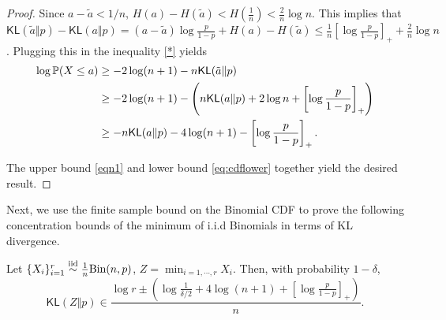 \documentclass[12pt]{article}
\newcommand{\KL}{\textsf{KL}}
\begin{document}
\begin{proof}
    

        Since $a - \tilde{a} < 1/n$, $H(a) - H(\tilde{a}) < H(\frac{1}{n}) < \frac{2}{n} \log n$. This implies that $\KL(\tilde a\Vert p) - \KL(a\Vert p)= (a-\tilde{a})\log \frac{p}{1-p} + H(a) - H(\tilde{a}) \leq \frac{1}{n} \left[ \log \frac{p}{1-p} \right]_+ + \frac{2}{n} \log n$. Plugging this in the inequality \eqref{*} yields
    \begin{align}
        \log \mathbb{P}(X \leq a) &\geq -2\log(n+1) - n\KL(\tilde{a}\Vert p)\notag\\
        &\geq -2\log(n+1) - \left(n\KL(a\Vert p) + 2\log n + \left[\log \frac{p}{1-p}\right]_+ \right)\notag\\
        &\geq -n \KL(a\Vert p) - 4\log(n+1) - \left[\log \frac{p}{1-p}\right]_+.\label{eq:cdflower}
    \end{align}
    
    The upper bound \eqref{eqn1} and lower bound \eqref{eq:cdflower} together yield the desired result.
\end{proof}


Next, we use the finite sample bound on the Binomial CDF to prove the following concentration bounds of the minimum of i.i.d Binomials in terms of KL divergence.


\iffalse
\begin{theorem}\label{thm1}
    Let $\{X_i\}_{i = 1}^r \overset{\mathrm{iid}}{\sim} \frac{1}{n}\textnormal{Bin}(n, p)$, $Z = \min_{i = 1, \cdots, r} X_i$. Then, with probability $1-\delta$,
    \[
    \KL(Z\Vert p) \in \frac{\log r \pm \left(\log \frac{1}{\delta/2} + 4\log (n+1) + \left[ \log \frac{p}{1-p} \right]_+ \right)}{n}.
    \]
\end{theorem}
\end{document}
